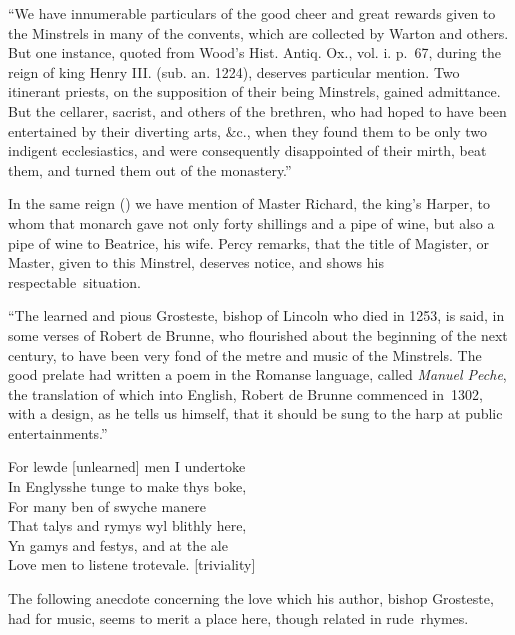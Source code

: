 “We have innumerable particulars of the good cheer and great rewards given to
the Minstrels in many of the convents, which are collected by Warton and others.
But one instance, quoted from Wood’s Hist. Antiq. Ox., vol. i. p.~67, during the reign
of king Henry III. (sub. an. 1224), deserves particular mention. Two itinerant
priests, on the supposition of their being Minstrels, gained admittance. But the
cellarer, sacrist, and others of the brethren, who had hoped to have been entertained
by their diverting arts, \&c., when they found them to be only two indigent ecclesiastics,
and were consequently disappointed of their mirth, beat them, and turned
them out of the monastery.”

In the same reign () we have mention of Master Richard, the king’s
Harper, to whom that monarch gave not only forty shillings and a pipe of wine,
but also a pipe of wine to Beatrice, his wife. Percy remarks, that the title of
Magister, or Master, given to this Minstrel, deserves notice, and shows his
respectable~situation.



“The learned and pious Grosteste, bishop \pagebreak 
of Lincoln who died in 1253, is said, 
\renewcommand\rectoheader{king john to edward i.}
in some verses of Robert de Brunne, who flourished about the beginning of the 
next century, to have been very fond of the metre and music of the Minstrels.
The good prelate had written a poem in the Romanse language, called \textit{Manuel
Peche}, the translation of which into English, Robert de Brunne commenced in~1302, 
with a design, as he tells us himself, that it should be sung to the harp at
public entertainments.”

\DFNsingle

\settowidth{\versewidth}{Hys Harper’s chaumbre was fast ther}
\begin{dcverse} For lewde [unlearned] men I undertoke\\
In Englysshe tunge to make thys boke,\\
For many ben of swyche manere\\

That talys and rymys wyl blithly here,\\
Yn gamys and festys, and at the ale\\
Love men to listene trotevale. [triviality]
\end{dcverse}


The following anecdote concerning the love which his author, bishop
Gros\-teste, had for music, seems to merit a place here, though related in rude~rhymes.


